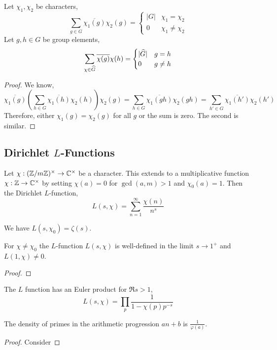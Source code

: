 \documentclass[12pt]{article}
\begin{document}
\begin{prop}
Let $\chi_1, \chi_2$ be characters,
\[ \sum_{g \in G} \overline{\chi_1(g)} \chi_2(g) = 
\begin{cases}
|G| & \chi_1 = \chi_2
\\
0 & \chi_1 \neq \chi_2
\end{cases} \]
Let $g,h \in G$ be group elements,
\[ \sum_{\chi \in \widehat{G}} \overline{\chi(g)} \chi(h) = 
\begin{cases}
|\widehat{G}| & g = h
\\
0 & g \neq h
\end{cases} \]
\end{prop}

\begin{proof}
We know,
\[ \overline{\chi_1(g)} \left( \sum_{h \in G} \overline{\chi_1(h)} \chi_2(h) \right) \chi_2(g) = \sum_{h \in G} \overline{\chi_1(gh)} \chi_2(gh) = \sum_{h' \in G} \overline{\chi_1(h')} \chi_2(h') \]
Therefore, either $\chi_1(g) = \chi_2(g)$ for all $g$ or the sum is zero. The second is similar.
\end{proof}

\subsection{Dirichlet $L$-Functions}

\begin{defn}
Let $\chi : (\mathbb{Z} / m \mathbb{Z})^\times \to \mathbb{C}^\times$ be a character. This extends to a multiplicative function $\chi : \mathbb{Z} \to \mathbb{C}^\times$ by setting $\chi(a) = 0$ for $\gcd(a, m) > 1$ and $\chi_0(a) = 1$. Then the Dirichlet $L$-function,
\[ L(s, \chi) = \sum_{n = 1}^\infty \frac{\chi(n)}{n^s} \]
\end{defn}

\begin{rmk}
We have $L(s, \chi_0) = \zeta(s)$.
\end{rmk}

\begin{prop}
For $\chi \neq \chi_0$ the $L$-function $L(s, \chi)$ is well-defined in the limit $s \to 1^{+}$ and $L(1, \chi) \neq 0$.
\end{prop}

\begin{proof}

\end{proof}

\begin{prop}
The $L$ function has an Euler product for $\Re{s} > 1$,
\[ L(s, \chi) = \prod_{p} \frac{1}{1 - \chi(p) p^{-s}} \]
\end{prop}

\begin{prop}
The density of primes in the arithmetic progression $an + b$ is $\frac{1}{\varphi(a)}$.
\end{prop}

\begin{proof}
Consider 
\end{proof}
\end{document}

